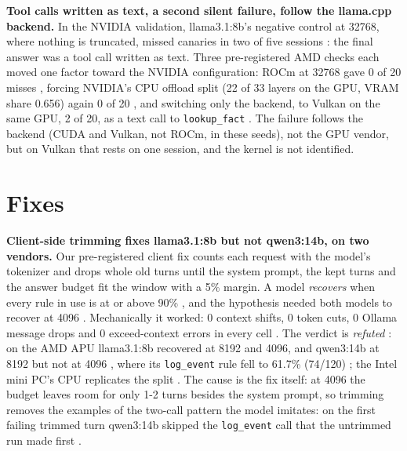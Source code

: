 \documentclass[conference,10pt]{IEEEtran}
\begin{document}
\textbf{Tool calls written as text, a second silent failure, follow the llama.cpp backend.} In the NVIDIA validation, llama3.1:8b's negative control at 32768, where nothing is truncated, missed canaries in two of five sessions%
: the final answer was a tool call written as text. Three pre-registered AMD checks each moved one factor toward the NVIDIA configuration: ROCm at 32768 gave 0 of 20 misses%
, forcing NVIDIA's CPU offload split (22 of 33 layers on the GPU, VRAM share 0.656) again 0 of 20%
, and switching only the backend, to Vulkan on the same GPU, 2 of 20, as a text call to \texttt{lookup\_fact}%
. The failure follows the backend (CUDA and Vulkan, not ROCm, in these seeds), not the GPU vendor, but on Vulkan that rests on one session, and the kernel is not identified.

\section{Fixes}\label{sec:4.7}

\textbf{Client-side trimming fixes llama3.1:8b but not qwen3:14b, on two vendors.} Our pre-registered client fix counts each request with the model's tokenizer and drops whole old turns until the system prompt, the kept turns and the answer budget fit the window with a 5\% %
margin. A model \emph{recovers} when every rule in use is at or above 90\%%
, and the hypothesis needed both models to recover at 4096%
. Mechanically it worked: 0 context shifts, 0 token cuts, 0 Ollama message drops and 0 exceed-context errors in every cell%
. The verdict is \emph{refuted}%
: on the AMD APU llama3.1:8b recovered at 8192 and 4096, and qwen3:14b at 8192 but not at 4096%
, where its \texttt{log\_event} rule fell to 61.7\% (74/120)%
; the Intel mini PC's CPU replicates the split%
. The cause is the fix itself: at 4096 the budget leaves room for only 1-2 %
turns besides the system prompt, so trimming removes the examples of the two-call pattern the model imitates: on the first failing trimmed turn qwen3:14b skipped the \texttt{log\_event} call that the untrimmed run made first%
.
\end{document}
